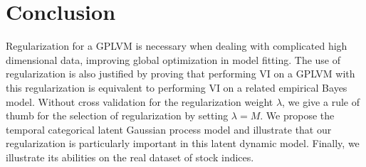 \documentclass{article}
\begin{document}
\section{Conclusion} \label{sec:C}
Regularization for a GPLVM is necessary when dealing with complicated high dimensional data, improving global optimization in model fitting. The use of regularization is also justified by proving that performing VI on a GPLVM with this regularization is equivalent to performing VI on a related empirical Bayes model. Without cross validation for the regularization weight $\lambda$, we give a rule of thumb for the selection of regularization by setting $\lambda = M$. We propose the temporal categorical latent Gaussian process model and illustrate that our regularization is particularly important in this latent dynamic model. Finally, we illustrate its abilities on the real dataset of stock indices.


















































\newpage



\newpage
\appendix

\end{document}
